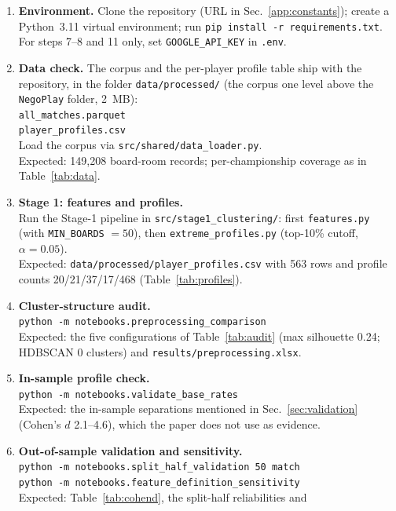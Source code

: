 \documentclass[runningheads]{llncs}
\begin{document}
\begin{enumerate}
  \item \textbf{Environment.} Clone the repository (URL in
  Sec.~\ref{app:constants}); create a Python~3.11 virtual environment;
  run \texttt{pip install -r requirements.txt}. For steps 7--8 and 11
  only, set \texttt{GOOGLE\_API\_KEY} in \texttt{.env}.
  \item \textbf{Data check.} The corpus and the per-player profile
  table ship with the repository, in the folder
  \texttt{data/processed/} (the corpus one level above the
  \texttt{NegoPlay} folder, 2~MB):\\
  \texttt{all\_matches.parquet}\\
  \texttt{player\_profiles.csv}\\
  Load the corpus via \texttt{src/shared/data\_loader.py}.\\
  Expected: 149{,}208 board-room records; per-championship coverage as
  in Table~\ref{tab:data}.
  \item \textbf{Stage 1: features and profiles.}\\
  Run the Stage-1 pipeline in \texttt{src/stage1\_clustering/}: first
  \texttt{features.py} (with \texttt{MIN\_BOARDS} $=50$), then
  \texttt{extreme\_profiles.py} (top-10\% cutoff, $\alpha=0.05$).\\
  Expected: \texttt{data/processed/player\_profiles.csv} with 563 rows
  and profile counts 20/21/37/17/468 (Table~\ref{tab:profiles}).
  \item \textbf{Cluster-structure audit.}\\
  \texttt{python -m notebooks.preprocessing\_comparison}\\
  Expected: the five configurations of Table~\ref{tab:audit} (max
  silhouette 0.24; HDBSCAN 0 clusters) and
  \texttt{results/preprocessing.xlsx}.
  \item \textbf{In-sample profile check.}\\
  \texttt{python -m notebooks.validate\_base\_rates}\\
  Expected: the in-sample separations mentioned in
  Sec.~\ref{sec:validation} (Cohen's $d$ 2.1--4.6), which the paper
  does not use as evidence.
  \item \textbf{Out-of-sample validation and sensitivity.}\\
  \texttt{python -m notebooks.split\_half\_validation 50 match}\\
  \texttt{python -m notebooks.feature\_definition\_sensitivity}\\
  Expected: Table~\ref{tab:cohend}, the split-half reliabilities and

\end{enumerate}
\end{document}
